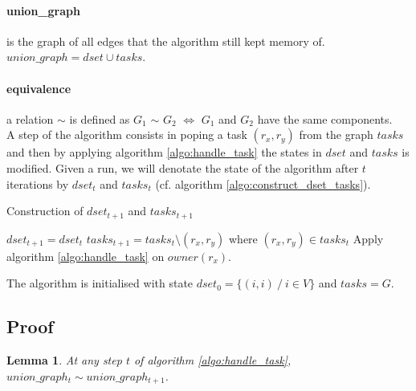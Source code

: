 \documentclass[12px]{article}
\newtheorem{lemma}[theorem]{Lemma}
\begin{document}
    \paragraph{union\_graph} is the graph of all edges that the algorithm still kept memory of. $union\_graph = dset \cup tasks$.

    \paragraph{equivalence} a relation $\sim$ is defined as $G_1$ $\sim$ $G_2$ $\Leftrightarrow$ $G_1$ and $G_2$ have the same components. \\

    A step of the algorithm consists in poping a task $(r_x, r_y)$ from the graph $tasks$ and then by applying algorithm \ref{algo:handle_task} the states in $dset$ and $tasks$ is modified.
    Given a run, we will denotate the state of the algorithm after $t$ iterations by $dset_t$ and $tasks_t$ (cf. algorithm \ref{algo:construct_dset_tasks}).

    \begin{algorithm}
      \caption{Construction of $dset_{t+1}$ and $tasks_{t+1}$}
      \begin{algorithmic}[1]
        \State $dset_{t+1} = dset_t$
        \State $tasks_{t+1} = tasks_t \setminus (r_x, r_y)$ where $(r_x, r_y) \in tasks_t$
        \State Apply algorithm \ref{algo:handle_task} on $owner(r_x)$.
      \end{algorithmic}
      \label{algo:construct_dset_tasks}
    \end{algorithm}

    The algorithm is initialised with state $dset_0 = \{(i, i)~/~i \in V\}$ and $tasks = G$.

  \subsection{Proof}
    \begin{lemma}
      \label{lemma:transitivity}
      At any step $t$ of algorithm \ref{algo:handle_task}, $union\_graph_t \sim union\_graph_{t+1}$.
    \end{lemma}
\end{document}
